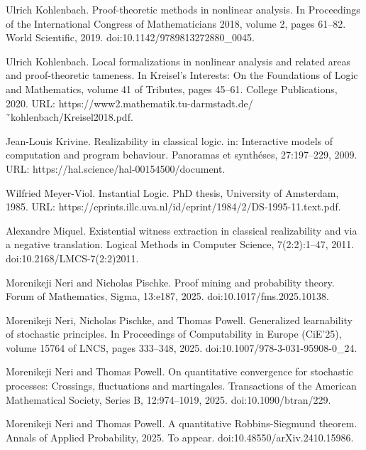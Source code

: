\documentclass[10pt,a4paper]{article}
\begin{document}
\par\noindent  [20]  Ulrich Kohlenbach.  Proof-theoretic methods in nonlinear analysis.  In Proceedings of the International Congress of Mathematicians 2018, volume 2, pages 61–82. World Scientific, 2019.  doi:10.1142/9789813272880\_0045.  
 
\par\noindent  [21]  Ulrich Kohlenbach.  Local formalizations in nonlinear analysis and related areas and proof-theoretic tameness.  In Kreisel’s Interests: On the Foundations of Logic and Mathematics, volume 41 of Tributes, pages 45–61. College Publications, 2020.  URL: https://www2.mathematik.tu-darmstadt.de/˜kohlenbach/Kreisel2018.pdf.  
 
\par\noindent  [22]  Jean-Louis Krivine.  Realizability in classical logic. in: Interactive models of computation and program behaviour.  Panoramas et synthéses, 27:197–229, 2009.  URL: https://hal.science/hal-00154500/document.  
 
\par\noindent  [23]  Wilfried Meyer-Viol.  Instantial Logic.  PhD thesis, University of Amsterdam, 1985.  URL: https://eprints.illc.uva.nl/id/eprint/1984/2/DS-1995-11.text.pdf.  
 
\par\noindent  [24]  Alexandre Miquel.  Existential witness extraction in classical realizability and via a negative translation.  Logical Methods in Computer Science, 7(2:2):1–47, 2011.  doi:10.2168/LMCS-7(2:2)2011.  
 
\par\noindent  [25]  Morenikeji Neri and Nicholas Pischke.  Proof mining and probability theory.  Forum of Mathematics, Sigma, 13:e187, 2025.  doi:10.1017/fms.2025.10138.  
 
\par\noindent  [26]  Morenikeji Neri, Nicholas Pischke, and Thomas Powell.  Generalized learnability of stochastic principles.  In Proceedings of Computability in Europe (CiE’25), volume 15764 of LNCS, pages 333–348, 2025.  doi:10.1007/978-3-031-95908-0\_24.  
 
\par\noindent  [27]  Morenikeji Neri and Thomas Powell.  On quantitative convergence for stochastic processes: Crossings, fluctuations and martingales.  Transactions of the American Mathematical Society, Series B, 12:974–1019, 2025.  doi:10.1090/btran/229.  
 
\par\noindent  [28]  Morenikeji Neri and Thomas Powell.  A quantitative Robbins-Siegmund theorem.  Annals of Applied Probability, 2025.  To appear.  doi:10.48550/arXiv.2410.15986.  
 
\end{document}
